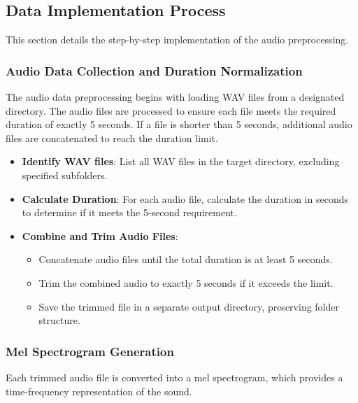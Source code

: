 \documentclass[conference]{IEEEtran}
\begin{document}
\subsection{Data Implementation Process}
This section details the step-by-step implementation of the audio preprocessing.

\subsubsection{Audio Data Collection and Duration Normalization}
The audio data preprocessing begins with loading WAV files from a designated directory. The audio files are processed to ensure each file meets the required duration of exactly 5 seconds. If a file is shorter than 5 seconds, additional audio files are concatenated to reach the duration limit.

\begin{itemize}
    \item \textbf{Identify WAV files}: List all WAV files in the target directory, excluding specified subfolders.
    \item \textbf{Calculate Duration}: For each audio file, calculate the duration in seconds to determine if it meets the 5-second requirement.
    \item \textbf{Combine and Trim Audio Files}:
        \begin{itemize}
            \item Concatenate audio files until the total duration is at least 5 seconds.
            \item Trim the combined audio to exactly 5 seconds if it exceeds the limit.
            \item Save the trimmed file in a separate output directory, preserving folder structure.
        \end{itemize}
\end{itemize}

\subsubsection{Mel Spectrogram Generation}
Each trimmed audio file is converted into a mel spectrogram, which provides a time-frequency representation of the sound.
\end{document}
